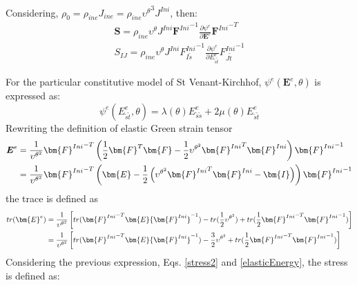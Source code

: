 \documentclass[oneside,11pt,times]{book}
\begin{document}
Considering, $\rho_0=\rho_{ine}J_{ine}=\rho_{ine}{\upsilon^{\theta}}^3 J^{Ini}$, then:
\begin{equation}
\begin{aligned}
\boldsymbol{S} =\rho_{ine}{\upsilon^{\theta}} J^{Ini}{\bm{F}^{Ini}}^{-1}\frac{\partial\psi^{e}}{\partial \boldsymbol{E}^e}{\bm{F}^{Ini}}^{-T}
\\{S}_{IJ} =\rho_{ine}{\upsilon^{\theta}} J^{Ini}{{F}^{Ini}_{I\tilde{s}}}^{-1}\frac{\partial\psi^{e}}{\partial {{E}^{e}_{\tilde{s}\tilde{t}}}}{{F}^{Ini}_{J\tilde{t}}}^{-1}
\label{stress2}
\end{aligned}
\end{equation}

For the particular constitutive model of St Venant-Kirchhof, $\psi^{e} (\boldsymbol{E}^e, \theta)$ is expressed as:
\begin{equation}
\psi^{e} ({{E}^{e}_{\tilde{s}\tilde{t}}}, \theta)=\lambda(\theta){{E}^{e}_{\tilde{s}\tilde{s}}}+2\mu(\theta){{E}^{e}_{\tilde{s}\tilde{t}}}
\label{elasticEnergy}
\end{equation}
Rewriting the definition of elastic Green strain
tensor
\begin{equation}
\begin{aligned}
\centering
\boldsymbol{E}^e&=\frac{1}{\upsilon^{{\theta}^2}}{\bm{F}^{Ini}}^{-T}\left(\frac{1}{2}{\bm{F}}^T\bm{F}-\frac{1}{2}{\upsilon^{{\theta}^2}}{\bm{F}^{Ini}}^{T}{\bm{F}^{Ini}} \right){\bm{F}^{Ini}}^{-1}\\
&=\frac{1}{\upsilon^{{\theta}^2}}{\bm{F}^{Ini}}^{-T}\left({\bm{E}}-\frac{1}{2}\left({\upsilon^{{\theta}^2}}{\bm{F}^{Ini}}^{T}{\bm{F}^{Ini}}-\bm{I}\right) \right){\bm{F}^{Ini}}^{-1}
\end{aligned}
\label{2piolaKirchoff}
\end{equation}
the trace is defined as
\begin{equation}
\begin{aligned}
\centering
tr(\bm{E}^e)&=\frac{1}{{\upsilon^{\theta^2}}}\left[tr({\bm{F}^{Ini}}^{-T}\bm{E}{\bm{F}^{Ini}}^{-1})-tr(\frac{1}{2}{\upsilon^{\theta^2}})+tr(\frac{1}{2}{\bm{F}^{Ini}}^{-T}{\bm{F}^{Ini}}^{-1})\right] \\ &=\frac{1}{{\upsilon^{\theta^2}}}\left[tr({\bm{F}^{Ini}}^{-T}\bm{E}{\bm{F}^{Ini}}^{-1})-\frac{3}{2}{\upsilon^{\theta^2}}+tr(\frac{1}{2}{\bm{F}^{Ini}}^{-T}{{\bm{F}^{Ini}}^{-1}}) \right]
\end{aligned}
\label{2piolaKirchoff}
\end{equation}
Considering the previous expression, Eqs. \eqref{stress2} and \eqref{elasticEnergy}, the stress is defined as:
\end{document}
